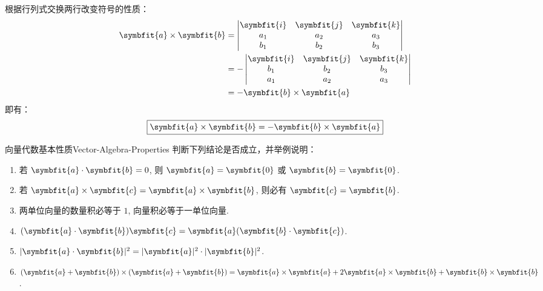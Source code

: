 \begin{myproof}

    根据行列式交换两行改变符号的性质：
    \begin{equation}
        \begin{aligned}
            \symbfit{a} \times \symbfit{b} & = \begin{vmatrix} \symbfit{i} & \symbfit{j} & \symbfit{k} \\ a_1 & a_2 & a_3 \\ b_1 & b_2 & b_3 \end{vmatrix}   \\
                                           & = - \begin{vmatrix} \symbfit{i} & \symbfit{j} & \symbfit{k} \\ b_1 & b_2 & b_3 \\ a_1 & a_2 & a_3 \end{vmatrix} \\
                                           & = -\symbfit{b} \times \symbfit{a}
        \end{aligned}
    \end{equation}
    即有：
    \begin{equation}
        \boxed{\symbfit{a} \times \symbfit{b} = -\symbfit{b} \times \symbfit{a}}
    \end{equation}
\end{myproof}


\begin{problem}{向量代数基本性质}{Vector-Algebra-Properties}
    判断下列结论是否成立，并举例说明：
    \begin{enumerate}
        \item 若 $\symbfit{a} \cdot \symbfit{b} = 0$, 则 $\symbfit{a} = \symbfit{0}$ 或 $\symbfit{b} = \symbfit{0}$.
        \item 若 $\symbfit{a} \times \symbfit{c} = \symbfit{a} \times \symbfit{b}$, 则必有 $\symbfit{c} = \symbfit{b}$.
        \item 两单位向量的数量积必等于 $1$, 向量积必等于一单位向量.
        \item $(\symbfit{a} \cdot \symbfit{b})\symbfit{c} = \symbfit{a}(\symbfit{b} \cdot \symbfit{c})$.
        \item $|\symbfit{a} \cdot \symbfit{b}|^2 = |\symbfit{a}|^2 \cdot |\symbfit{b}|^2$.
        \item $(\symbfit{a} + \symbfit{b}) \times (\symbfit{a} + \symbfit{b}) = \symbfit{a} \times \symbfit{a} + 2\symbfit{a} \times \symbfit{b} + \symbfit{b} \times \symbfit{b}$.
    \end{enumerate}
\end{problem}

